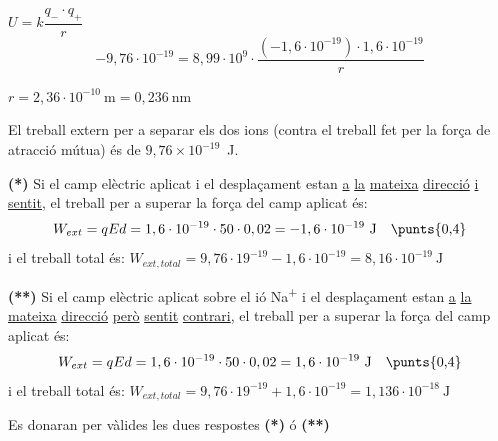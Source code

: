 \begin{solapartat}
 $U = k\dfrac{q_-\cdot q_+}{r}$
\[ -9,76\cdot 10^{-19} = 8,99\cdot 10^{9}\cdot\frac{\left(-1,6\cdot 10^{-19}\right)\cdot 1,6\cdot 10^{-19}}{r} \]

 $r = 2,36\cdot 10^{-10}\ \mathrm{m} = 0,236\ \mathrm{nm}$
\end{solapartat}

\begin{solapartat}
El treball extern per a separar els dos ions (contra el treball fet per la força de atracció mútua) és de $9,76\times 10^{-19}$~J. 

\textbf{(*)} Si el camp elèctric aplicat i el desplaçament estan \underline{a} \underline{la} \underline{mateixa} \underline{direcció} \underline{i} \underline{sentit,} el treball per a superar la força del camp aplicat és:
\[ W_{ext} = qEd = 1,6\cdot 10^{-19}\cdot 50\cdot 0,02 = -1,6\cdot 10^{-19}\ \mathrm{J} \quad \text{\punts{0,4}} \]
i el treball total és:
 $W_{ext,total} = 9,76\cdot 19^{-19} - 1,6\cdot 10^{-19} = 8,16\cdot 10^{-19}\ \mathrm{J}$

\textbf{(**)} Si el camp elèctric aplicat sobre el ió Na\textsuperscript{+} i el desplaçament estan \underline{a} \underline{la} \underline{mateixa} \underline{direcció} \underline{però} \underline{sentit} \underline{contrari}, el treball per a superar la força del camp aplicat és:
\[ W_{ext} = qEd = 1,6\cdot 10^{-19}\cdot 50\cdot 0,02 = 1,6\cdot 10^{-19}\ \mathrm{J} \quad \text{\punts{0,4}} \]
i el treball total és:
 $W_{ext,total} = 9,76\cdot 19^{-19} + 1,6\cdot 10^{-19} = 1,136\cdot 10^{-18}\ \mathrm{J}$

Es donaran per vàlides les dues respostes \textbf{(*)} ó \textbf{(**)}
\end{solapartat}
